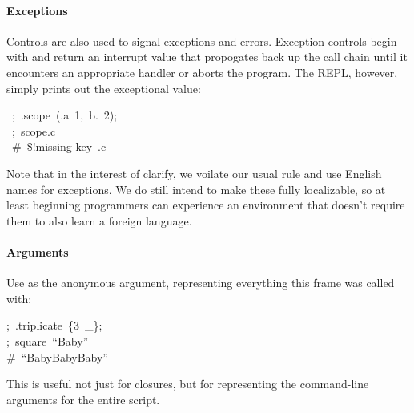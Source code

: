 \documentclass[preprint]{{acmart}}
\begin{document}
\paragraph{Exceptions}\label{sec-exceptions}%

\noindent{}Controls are also used to signal exceptions and errors.  Exception controls
begin with  and return an interrupt value that propogates back up the call
chain until it encounters an appropriate handler or aborts the program.  The REPL,
however, simply prints out the exceptional value:%
\begin{mdpre}%
\noindent~;~.scope~(.a~1,~b.~2);\\
~;~scope.c\\
~{\#~\$!missing-key~.c}%
\end{mdpre}\noindent{}Note that in the interest of clarify, we voilate our usual rule and use
English names for exceptions. We do still intend to make these fully
localizable, so at least beginning programmers can experience an environment
that doesn't require them to also learn a foreign language.

\paragraph{Arguments}\label{sec-arguments}%

\noindent{}Use \mdcode{\_} as the anonymous argument, representing everything this frame
was called with:%
\begin{mdpre}%
\noindent;~.triplicate~\{3~\_\};\\
;~square~“{Baby}”\\
{\#~“BabyBabyBaby”}%
\end{mdpre}\noindent{}This is useful not just for closures, but for representing the command-line
arguments for the entire script.
\end{document}
